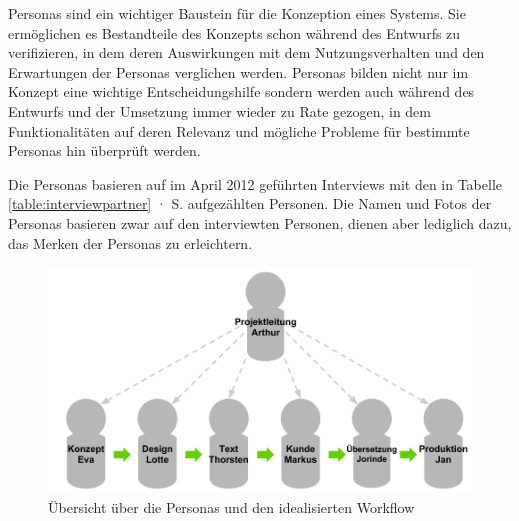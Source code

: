 Personas sind ein wichtiger Baustein für die Konzeption eines Systems. Sie ermöglichen es Bestandteile des Konzepts schon während des Entwurfs zu verifizieren, in dem deren Auswirkungen mit dem Nutzungsverhalten und den Erwartungen der Personas verglichen werden. Personas bilden nicht nur im Konzept eine wichtige Entscheidungshilfe sondern werden auch während des Entwurfs und der Umsetzung immer wieder zu Rate gezogen, in dem Funktionalitäten auf deren Relevanz und mögliche Probleme für bestimmte Personas hin überprüft werden. \cite[S.38 ff.]{cohn2004user}

Die Personas basieren auf im April 2012 geführten Interviews mit den in Tabelle \ref{table:interviewpartner} · S.\pageref{table:interviewpartner} aufgezählten Personen. Die Namen und Fotos der Personas basieren zwar auf den interviewten Personen, dienen aber lediglich dazu, das Merken der Personas zu erleichtern.

\begin{figure}[htb]
\begin{center}
\includegraphics[width=\textwidth]{media/Uebersicht-Personas.pdf}
\caption{Übersicht über die Personas und den idealisierten Workflow}
\label{chart:uebersicht-personas}
\end{center}
\end{figure}

